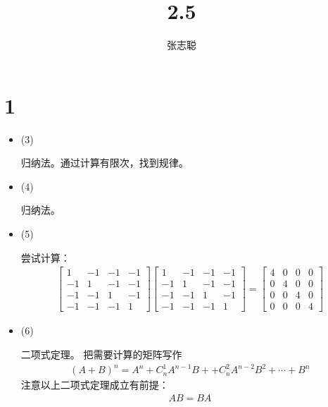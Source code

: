 \documentclass{article}
\begin{document}
\title{2.5}
\author{张志聪}
\maketitle

\section*{1}

\begin{itemize}
  \item (3)

        归纳法。通过计算有限次，找到规律。

  \item (4)

        归纳法。

  \item (5)

        尝试计算：
        \begin{align*}
          \begin{bmatrix}
            1  & -1 & -1 & -1 \\
            -1 & 1  & -1 & -1 \\
            -1 & -1 & 1  & -1 \\
            -1 & -1 & -1 & 1
          \end{bmatrix}
          \begin{bmatrix}
            1  & -1 & -1 & -1 \\
            -1 & 1  & -1 & -1 \\
            -1 & -1 & 1  & -1 \\
            -1 & -1 & -1 & 1
          \end{bmatrix}
          =
          \begin{bmatrix}
            4 & 0 & 0 & 0 \\
            0 & 4 & 0 & 0 \\
            0 & 0 & 4 & 0 \\
            0 & 0 & 0 & 4
          \end{bmatrix}
        \end{align*}

  \item (6)

        二项式定理。
        把需要计算的矩阵写作
        \begin{align*}
          (A + B)^n
          = A^n + C_n^1 A^{n - 1}B +  + C_n^2 A^{n - 2}B^{2} + \cdots + B^n
        \end{align*}
        注意以上二项式定理成立有前提：
        \begin{align*}
          AB = BA
        \end{align*}
\end{itemize}
\end{document}
